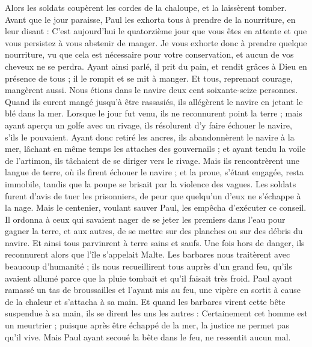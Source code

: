 \begin{multicols}{2}
Alors les soldats coupèrent les cordes de la chaloupe, et la laissèrent tomber.
Avant que le jour paraisse, Paul les exhorta tous à prendre de la nourriture, en leur disant : C'est aujourd'hui le quatorzième jour que vous êtes en attente et que vous persistez à vous abstenir de manger.
Je vous exhorte donc à prendre quelque nourriture, vu que cela est nécessaire pour votre conservation, et aucun de vos cheveux ne se perdra.
Ayant ainsi parlé, il prit du pain, et rendit grâces à Dieu en présence de tous ; il le rompit et se mit à manger.
Et tous, reprenant courage, mangèrent aussi.
Nous étions dans le navire deux cent soixante-seize personnes.
Quand ils eurent mangé jusqu'à être rassasiés, ils allégèrent le navire en jetant le blé dans la mer.
Lorsque le jour fut venu, ils ne reconnurent point la terre ; mais ayant aperçu un golfe avec un rivage, ils résolurent d'y faire échouer le navire, s'ils le pouvaient.
Ayant donc retiré les ancres, ils abandonnèrent le navire à la mer, lâchant en même temps les attaches des gouvernails ; et ayant tendu la voile de l'artimon, ils tâchaient de se diriger vers le rivage.
Mais ils rencontrèrent une langue de terre, où ils firent échouer le navire ; et la proue, s'étant engagée, resta immobile, tandis que la poupe se brisait par la violence des vagues.
Les soldats furent d'avis de tuer les prisonniers, de peur que quelqu'un d'eux ne s'échappe à la nage.
Mais le centenier, voulant sauver Paul, les empêcha d'exécuter ce conseil. Il ordonna à ceux qui savaient nager de se jeter les premiers dans l'eau pour gagner la terre,
et aux autres, de se mettre sur des planches ou sur des débris du navire. Et ainsi tous parvinrent à terre sains et saufs.
\VerseOne{}Une fois hors de danger, ils reconnurent alors que l'île s'appelait Malte.
Les barbares nous traitèrent avec beaucoup d'humanité ; ils nous recueillirent tous auprès d'un grand feu, qu'ils avaient allumé parce que la pluie tombait et qu'il faisait très froid.
Paul ayant ramassé un tas de broussailles et l'ayant mis au feu, une vipère en sortit à cause de la chaleur et s'attacha à sa main.
Et quand les barbares virent cette bête suspendue à sa main, ils se dirent les uns les autres : Certainement cet homme est un meurtrier ; puisque après être échappé de la mer, la justice ne permet pas qu'il vive. 
Mais Paul ayant secoué la bête dans le feu, ne ressentit aucun mal.

\end{multicols}
